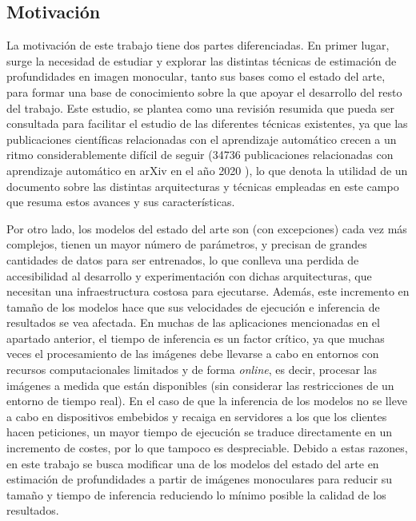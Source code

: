 \subsection{Motivación}

La motivación de este trabajo tiene dos partes diferenciadas. En primer lugar, surge la necesidad de estudiar y explorar las distintas técnicas de estimación de profundidades en imagen monocular, tanto sus bases como el estado del arte, para formar una base de conocimiento sobre la que apoyar el desarrollo del resto del trabajo. Este estudio, se plantea como una revisión resumida que pueda ser consultada para facilitar el estudio de las diferentes técnicas existentes, ya que las publicaciones científicas relacionadas con el aprendizaje automático crecen a un ritmo considerablemente difícil de seguir (34736 publicaciones relacionadas con aprendizaje automático en arXiv en el año 2020 \cite{ai_index_report_2021}), lo que denota la utilidad de un documento sobre las distintas arquitecturas y técnicas empleadas en este campo que resuma estos avances y sus características. 

Por otro lado, los modelos del estado del arte son (con excepciones) cada vez más complejos, tienen un mayor número de parámetros, y precisan de grandes cantidades de datos para ser entrenados, lo que conlleva una perdida de accesibilidad al desarrollo y experimentación con dichas arquitecturas, que necesitan una infraestructura costosa para ejecutarse. Además, este incremento en tamaño de los modelos hace que sus velocidades de ejecución e inferencia de resultados se vea afectada. En muchas de las aplicaciones mencionadas en el apartado anterior, el tiempo de inferencia es un factor crítico, ya que muchas veces el procesamiento de las imágenes debe llevarse a cabo en entornos con recursos computacionales limitados y de forma \textit{online}, es decir, procesar las imágenes a medida que están disponibles (sin considerar las restricciones de un entorno de tiempo real). En el caso de que la inferencia de los modelos no se lleve a cabo en dispositivos embebidos y recaiga en servidores a los que los clientes hacen peticiones, un mayor tiempo de ejecución se traduce directamente en un incremento de costes, por lo que tampoco es despreciable. Debido a estas razones, en este trabajo se busca modificar una de los modelos del estado del arte en estimación de profundidades a partir de imágenes monoculares para reducir su tamaño y tiempo de inferencia reduciendo lo mínimo posible la calidad de los resultados.

